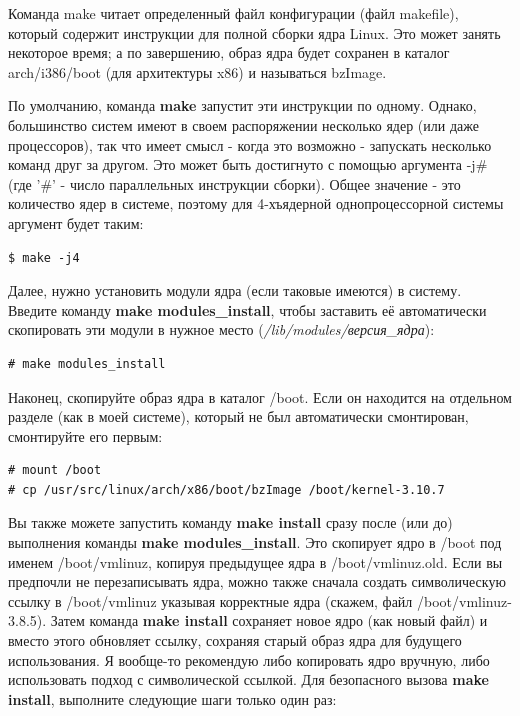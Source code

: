 \documentclass[10pt]{book}
\begin{document}
Команда make читает определенный файл конфигурации (файл makefile), который содержит инструкции для полной сборки ядра Linux. Это может занять некоторое время; а по завершению, образ ядра будет сохранен в каталог arch/i386/boot (для архитектуры x86) и называться bzImage.

По умолчанию, команда \textbf{make} запустит эти инструкции по одному. Однако, большинство систем имеют в своем распоряжении несколько ядер (или даже процессоров), так что имеет смысл - когда это возможно - запускать несколько команд друг за другом. Это может быть достигнуто с помощью аргумента -j\# (где '\#' - число параллельных инструкции сборки).
Общее значение - это количество ядер в системе, поэтому для 4-хъядерной однопроцессорной системы аргумент будет таким:

\vspace{3mm}
\begin{tcolorbox}
\begin{lstlisting}
$ make -j4
\end{lstlisting}
\end{tcolorbox}

Далее, нужно установить модули ядра (если таковые имеются) в систему. Введите команду \textbf{make modules\_install}, чтобы заставить её автоматически скопировать эти модули в нужное место (\textit{/lib/modules/версия\_ядра}):

\vspace{3mm}
\begin{tcolorbox}
\begin{lstlisting}
# make modules_install
\end{lstlisting}
\end{tcolorbox}

Наконец, скопируйте образ ядра в каталог /boot. Если он находится на отдельном разделе (как в моей системе), который не был автоматически смонтирован, смонтируйте его первым:

\vspace{3mm}
\begin{tcolorbox}
\begin{lstlisting}
# mount /boot
# cp /usr/src/linux/arch/x86/boot/bzImage /boot/kernel-3.10.7
\end{lstlisting}
\end{tcolorbox}

Вы также можете запустить команду \textbf{make install} сразу после (или до) выполнения команды \textbf{make modules\_install}. Это скопирует ядро в /boot под именем /boot/vmlinuz, копируя предыдущее ядра в /boot/vmlinuz.old. Если вы предпочли не перезаписывать ядра, можно также сначала создать символическую ссылку в /boot/vmlinuz указывая корректные ядра (скажем, файл /boot/vmlinuz-3.8.5). Затем команда \textbf{make install} сохраняет новое ядро (как новый файл) и вместо этого обновляет ссылку, сохраняя старый образ ядра для будущего использования. Я вообще-то рекомендую либо копировать ядро вручную, либо использовать подход с символической ссылкой.
Для безопасного вызова \textbf{make install}, выполните следующие шаги только один раз:
\end{document}
